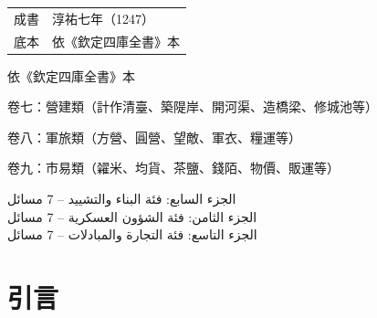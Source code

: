 \documentclass[11pt,a4paper]{article}
\begin{document}
\begin{titlepage}
\begin{center}
{\fontsize{10}{14}\selectfont\color{notecolor}
\begin{tabular}{rl}
成書 & 淳祐七年（1247） \\
底本 & 依《欽定四庫全書》本 \\
\end{tabular}
}

\vfill

{\small 依《欽定四庫全書》本}

\vspace{0.2cm}

{\small\color{notecolor} 卷七：營建類（計作清臺、築隄岸、開河渠、造橋梁、修城池等）}

{\small\color{notecolor} 卷八：軍旅類（方營、圓營、望敵、軍衣、糧運等）}

{\small\color{notecolor} 卷九：市易類（糴米、均貨、茶鹽、錢陌、物價、販運等）}

\vspace{0.3cm}

{\small\arabicfont\beginR\color{notecolor}
الجزء السابع: فئة البناء والتشييد -- 7 مسائل\\
الجزء الثامن: فئة الشؤون العسكرية -- 7 مسائل\\
الجزء التاسع: فئة التجارة والمبادلات -- 7 مسائل
\endR}

\end{center}
\end{titlepage}

\tableofcontents
\newpage

\section*{引言}
\end{document}

